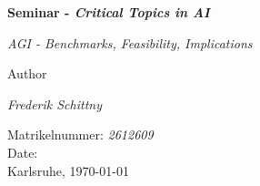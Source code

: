 \begin{titlepage}
\begin{center}
	\vspace{3em}	
    {\Huge\bfseries Seminar - \textit{Critical Topics in AI}\par}
    \vspace{2em}
    {\huge \textit{AGI - Benchmarks, Feasibility, Implications} \par}
    \vspace{3em}
    Author\\
	\vspace{1em}
    {\Large \textit{Frederik Schittny}\par}
    \vspace{1em}
    Matrikelnummer: \textit{2612609}\\
    \vspace{3em}
    Date:\\
	\vspace{1em}
    Karlsruhe, \today
\end{center}
\end{titlepage}